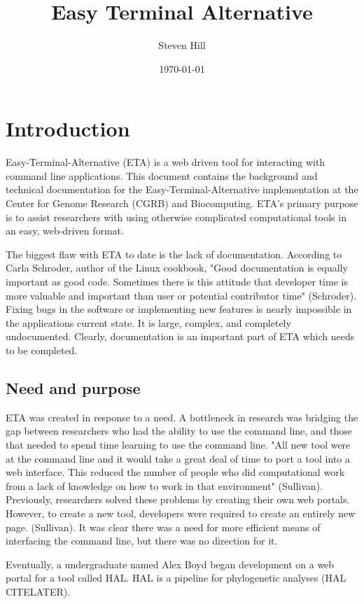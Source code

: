 \documentclass[a4paper,12pt]{article}
\author{Steven Hill}
\title{Easy Terminal Alternative}
\date{\today}
\begin{document}
\maketitle
\tableofcontents

\section{Introduction}
 Easy-Terminal-Alternative (ETA) is a web driven tool for interacting with command line applications. This document contains the background and technical documentation for the Easy-Terminal-Alternative implementation at the Center for Genome Research (CGRB) and Biocomputing. ETA's primary purpose is to assist researchers with using otherwise complicated computational tools in an easy, web-driven format.
 
 The biggest flaw with ETA to date is the lack of documentation. According to Carla Schroder, author of the 
Linux cookbook, "Good documentation is equally important as good code. Sometimes there is this attitude that developer time is more valuable and important than user or potential contributor time" (Schroder). Fixing bugs in the software or implementing new features is nearly impossible in the applications current state. It is large, complex, and completely undocumented. Clearly, documentation is an important part of ETA which needs to be completed.

\subsection{Need and purpose}
 
 ETA was created in response to a need. A bottleneck in research was bridging the gap between researchers who had the ability to use the command line, and those that needed to spend time learning to use the command line. "All new tool were at the command line and it would take a great deal of time to port a tool into a web interface. This reduced the number of people who did computational work from a lack of knowledge on how to work in that environment" (Sullivan). Previously, researchers solved these problems by creating their own web portals. However, to create a new tool, developers were required to create an entirely new page. (Sullivan). It was clear there was a need for more efficient means of interfacing the command line, but there was no direction for it.
 
 Eventually, a undergraduate named Alex Boyd began development on a web portal for a tool called HAL. HAL is a pipeline for phylogenetic analyses (HAL CITELATER).
 
\end{document}
